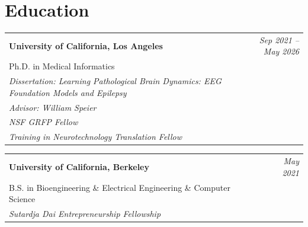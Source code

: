 \section*{Education}

\begin{tabularx}{\linewidth}{@{}X r@{}}
	\textbf{University of California, Los Angeles} & \textit{Sep 2021 -- May 2026} \\
	Ph.D. in Medical Informatics & \\
    \textit{Dissertation: Learning Pathological Brain Dynamics: EEG Foundation Models and Epilepsy} \\
    \textit{Advisor: William Speier} \\
    \textit{NSF GRFP Fellow} \\
    \textit{Training in Neurotechnology Translation Fellow}
\end{tabularx}
\vspace{0.4em}

\begin{tabularx}{\linewidth}{@{}X r@{}}
	\textbf{University of California, Berkeley} & \textit{May 2021} \\
	B.S. in Bioengineering \& Electrical Engineering \& Computer Science & \\
    \textit{Sutardja Dai Entrepreneurship Fellowship}
\end{tabularx}
